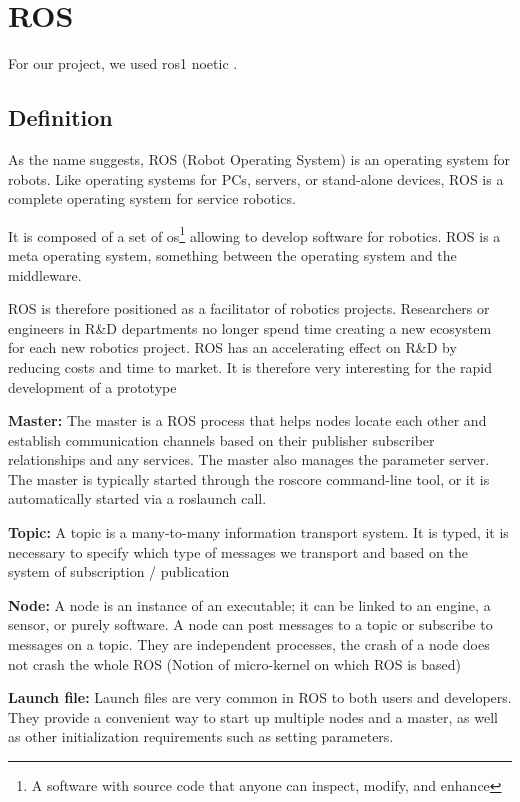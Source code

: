 \section{ROS}\insertloftspace
\setcounter{figure}{0}\setcounter{table}{0}

For our project, we used ros1 noetic \cite{ROS}.

\subsection{Definition}

As the name suggests, ROS (Robot Operating System) is an operating system for robots. Like operating systems for PCs, servers, or stand-alone devices, ROS is a complete operating system for service robotics.

\bigbreak
It is composed of a set of \gls{os}\footnote{A software with source code that anyone can inspect, modify, and enhance} allowing to develop software for robotics. ROS is a meta operating system, something between the operating system and the middleware.

\bigbreak
ROS is therefore positioned as a facilitator of robotics projects. Researchers or engineers in R\&D departments no longer spend time creating a new ecosystem for each new robotics project. ROS has an accelerating effect on R\&D by reducing costs and time to market. It is therefore very interesting for the rapid development of a prototype

\bigbreak
\textbf{Master:} The master is a ROS process that helps nodes locate each other and establish communication channels based on their publisher subscriber relationships and any services. The master also manages the parameter server. The master is typically started through the roscore command-line tool, or it is automatically started via a roslaunch call.

\bigbreak
\textbf{Topic:} A topic is a many-to-many information transport system. It is typed, it is necessary to specify which type of messages we transport and based on the system of subscription / publication 

\bigbreak
\textbf{Node:} A node is an instance of an executable; it can be linked to an engine, a sensor, or purely software. A node can post messages to a topic or subscribe to messages on a topic. They are independent processes, the crash of a node does not crash the whole ROS (Notion of micro-kernel on which ROS is based)

\bigbreak
\textbf{Launch file:} Launch files are very common in ROS to both users and developers. They provide a convenient way to start up multiple nodes and a master, as well as other initialization requirements such as setting parameters.


